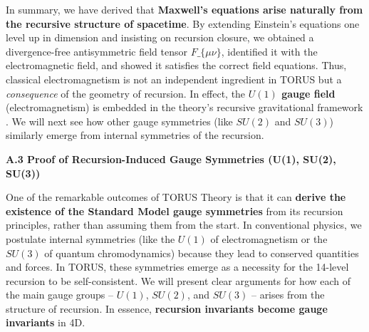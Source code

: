\documentclass[]{article}
\begin{document}
In summary, we have derived that \textbf{Maxwell's equations arise
naturally from the recursive structure of spacetime}. By extending
Einstein's equations one level up in dimension and insisting on
recursion closure, we obtained a divergence-free antisymmetric field
tensor $F\_\{\mu\nu\}$, identified it
with the electromagnetic field, and showed it satisfies the correct
field equations​. Thus, classical electromagnetism is not an independent
ingredient in TORUS but a \emph{consequence} of the geometry of
recursion. In effect, the \textbf{$U(1)$ gauge field}
(electromagnetism) is embedded in the theory's recursive gravitational
framework​. We will next see how other gauge symmetries (like $SU(2)$
and $SU(3)$) similarly emerge from internal symmetries of the
recursion.

\textbf{A.3 Proof of Recursion-Induced Gauge Symmetries (U(1), SU(2),
SU(3))}

One of the remarkable outcomes of TORUS Theory is that it can
\textbf{derive the existence of the Standard Model gauge symmetries}
from its recursion principles, rather than assuming them from the start.
In conventional physics, we postulate internal symmetries (like the
$U(1)$ of electromagnetism or the $SU(3)$ of quantum chromodynamics)
because they lead to conserved quantities and forces. In TORUS, these
symmetries emerge as a necessity for the 14-level recursion to be
self-consistent​. We will present clear arguments for how each of the
main gauge groups -- $U(1)$, $SU(2)$, and $SU(3)$ -- arises from
the structure of recursion. In essence, \textbf{recursion invariants
become gauge invariants} in 4D.
\end{document}
